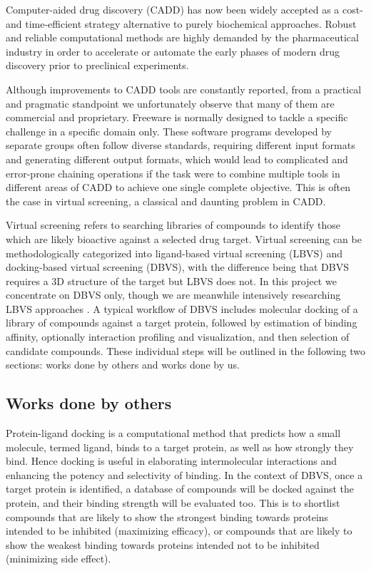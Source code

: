 \documentclass[a4paper,12pt]{article}
\begin{document}
Computer-aided drug discovery (CADD) has now been widely accepted as a cost- and time-efficient strategy alternative to purely biochemical approaches. Robust and reliable computational methods are highly demanded by the pharmaceutical industry in order to accelerate or automate the early phases of modern drug discovery prior to preclinical experiments.

Although improvements to CADD tools are constantly reported, from a practical and pragmatic standpoint we unfortunately observe that many of them are commercial and proprietary. Freeware is normally designed to tackle a specific challenge in a specific domain only. These software programs developed by separate groups often follow diverse standards, requiring different input formats and generating different output formats, which would lead to complicated and error-prone chaining operations if the task were to combine multiple tools in different areas of CADD to achieve one single complete objective. This is often the case in virtual screening, a classical and daunting problem in CADD.

Virtual screening refers to searching libraries of compounds to identify those which are likely bioactive against a selected drug target. Virtual screening can be methodologically categorized into ligand-based virtual screening (LBVS) and docking-based virtual screening (DBVS), with the difference being that DBVS requires a 3D structure of the target but LBVS does not. In this project we concentrate on DBVS only, though we are meanwhile intensively researching LBVS approaches \citep{1749}. A typical workflow of DBVS includes molecular docking of a library of compounds against a target protein, followed by estimation of binding affinity, optionally interaction profiling and visualization, and then selection of candidate compounds. These individual steps will be outlined in the following two sections: works done by others and works done by us.

\subsection*{Works done by others}

Protein-ligand docking is a computational method that predicts how a small molecule, termed ligand, binds to a target protein, as well as how strongly they bind. Hence docking is useful in elaborating intermolecular interactions and enhancing the potency and selectivity of binding. In the context of DBVS, once a target protein is identified, a database of compounds will be docked against the protein, and their binding strength will be evaluated too. This is to shortlist compounds that are likely to show the strongest binding towards proteins intended to be inhibited (maximizing efficacy), or compounds that are likely to show the weakest binding towards proteins intended not to be inhibited (minimizing side effect).
\end{document}
